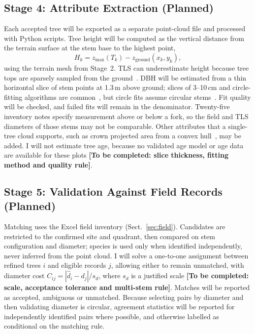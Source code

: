 \documentclass[runningheads]{llncs}
\newcommand{\todo}[1]{\textbf{[To be completed: #1]}}
\begin{document}
\subsection{Stage 4: Attribute Extraction (Planned)}\label{sec:attr}
Each accepted tree will be exported as a separate point-cloud file and processed with Python scripts. Tree height will be computed as the vertical distance from the terrain surface at the stem base to the highest point,
\begin{equation}
H_k = z_{\max}(T_k) - z_{\text{ground}}(x_k, y_k),
\end{equation}
using the terrain mesh from Stage~2. TLS can underestimate height because tree tops are sparsely sampled from the ground~\cite{calders2020,cushman2026}. DBH will be estimated from a thin horizontal slice of stem points at 1.3\,m above ground; slices of 3--10\,cm and circle-fitting algorithms are common~\cite{cushman2026}, but circle fits assume circular stems~\cite{calders2020}. Fit quality will be checked, and failed fits will remain in the denominator. Twenty-five inventory notes specify measurement above or below a fork, so the field and TLS diameters of those stems may not be comparable. Other attributes that a single-tree cloud supports, such as crown projected area from a convex hull~\cite{cushman2026}, may be added. I will not estimate tree age, because no validated age model or age data are available for these plots \todo{slice thickness, fitting method and quality rule}.

\subsection{Stage 5: Validation Against Field Records (Planned)}\label{sec:valid}
Matching uses the Excel field inventory (Sect.~\ref{sec:field}). Candidates are restricted to the confirmed site and quadrant, then compared on stem configuration and diameter; species is used only when identified independently, never inferred from the point cloud. I will solve a one-to-one assignment between refined trees $i$ and eligible records $j$, allowing either to remain unmatched, with diameter cost $C_{ij}=|\hat d_i-d_j|/s_d$, where $s_d$ is a justified scale \todo{scale, acceptance tolerance and multi-stem rule}. Matches will be reported as accepted, ambiguous or unmatched. Because selecting pairs by diameter and then validating diameter is circular, agreement statistics will be reported for independently identified pairs where possible, and otherwise labelled as conditional on the matching rule.
\end{document}
